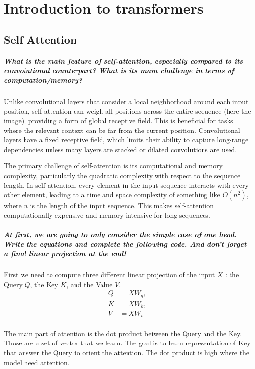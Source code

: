 \chapter{Introduction to transformers}
\section{Self Attention}
\paragraph{What is the main feature of self-attention, especially compared to its convolutional counterpart? What is its main challenge in terms of computation/memory?}
Unlike convolutional layers that consider a local neighborhood around each input position, self-attention can weigh all positions across the entire sequence (here the image), providing a form of global receptive field. This is beneficial for tasks where the relevant context can be far from the current position. Convolutional layers have a fixed receptive field, which limits their ability to capture long-range dependencies unless many layers are stacked or dilated convolutions are used. 

The primary challenge of self-attention is its computational and memory complexity, particularly the quadratic complexity with respect to the sequence length. In self-attention, every element in the input sequence interacts with every other element, leading to a time and space complexity of something like $ O(n^2) $, where $n$ is the length of the input sequence. This makes self-attention computationally expensive and memory-intensive for long sequences.

\paragraph{At first, we are going to only consider the simple case of one head. Write the equations and complete the following code. And don't forget a final linear projection at the end!}

First we need to compute three different linear projection of the input $ X $ : the Query $ Q $, the Key $ K $, and the Value $ V $.
\begin{align*}
    Q &= X W_q, \\
    K &= X W_k, \\
    V &= X W_v  \\
\end{align*}


The main part of attention is the dot product between the Query and the Key. Those are a set of vector that we learn. The goal is to learn representation of Key that answer the Query to orient the attention. The dot product is high where the model need attention. 

